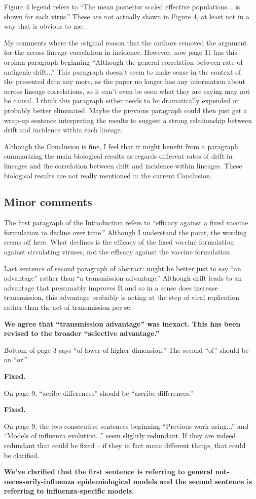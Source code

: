 \documentclass[11pt,oneside,letterpaper]{article}
\begin{document}
Figure 4 legend refers to ``The mean posterior scaled effective populations... is shown for each virus.'' These are not actually shown in Figure 4, at least not in a way that is obvious to me. 

My comments where the original reason that the authors removed the argument for the across lineage correlation in incidence. However, now page 11 has this orphan paragraph beginning ``Although the general correlation between rate of antigenic drift...'' This paragraph doesn't seem to make sense in the context of the presented data any more, as the paper no longer has any information about across lineage correlations, so it can't even be seen what they are saying may not be causal. I think this paragraph either needs to be dramatically expended or probably better eliminated. Maybe the previous paragraph could then just get a wrap-up sentence interpreting the results to suggest a strong relationship between drift and incidence within each lineage. 

Although the Conclusion is fine, I feel that it might benefit from a paragraph summarizing the main biological results as regards different rates of drift in lineages and the correlation between drift and incidence within lineages. These biological results are not really mentioned in the current Conclusion. 

\subsection*{Minor comments}

The first paragraph of the Introduction refers to ``efficacy against a fixed vaccine formulation to decline over time.'' Although I understand the point, the wording seems off here. What declines is the efficacy of the fixed vaccine formulation against circulating viruses, not the efficacy against the vaccine formulation. 

Last sentence of second paragraph of abstract: might be better just to say ``an advantage'' rather than ``a transmission advantage.'' Although drift leads to an advantage that presumably improves R and so in a sense does increase transmission, this advantage probably is acting at the step of viral replication rather than the act of transmission per se. 

\textbf{We agree that ``transmission advantage'' was inexact.  This has been revised to the broader ``selective advantage.''}

Bottom of page 3 says ``of lower of higher dimension.'' The second ``of'' should be an ``or.'' 

\textbf{Fixed.}

On page 9, ``acribe differences'' should be ``ascribe differences.''

\textbf{Fixed.}

On page 9, the two consecutive sentences beginning ``Previous work using...'' and ``Models of influenza evolution...'' seem slightly redundant. If they are indeed redundant that could be fixed -- if they in fact mean different things, that could be clarified. 

\textbf{We've clarified that the first sentence is referring to general not-necessarily-influenza epidemiological models and the second sentence is referring to influenza-specific models.}
\end{document}
